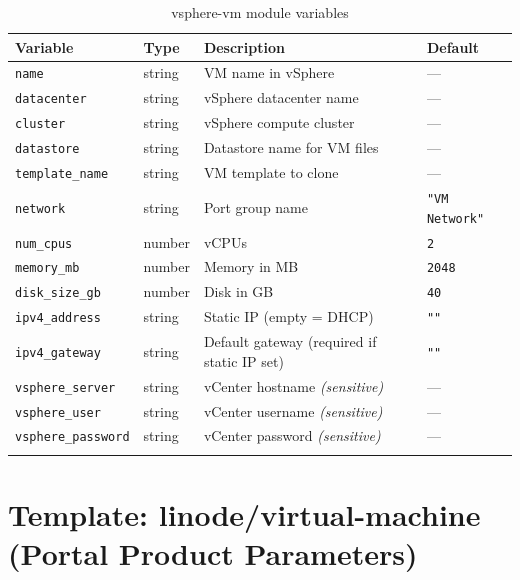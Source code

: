 \documentclass[12pt,a4paper,twoside]{report}
\newcommand{\code}[1]{\texttt{#1}}
\begin{document}
\begin{longtable}{@{}L{4.2cm}lL{5.3cm}l@{}}
  \toprule
  \textbf{Variable} & \textbf{Type} & \textbf{Description} & \textbf{Default} \\
  \midrule
  \endhead
  \code{name}              & string & VM name in vSphere                           & — \\
  \code{datacenter}        & string & vSphere datacenter name                      & — \\
  \code{cluster}           & string & vSphere compute cluster                      & — \\
  \code{datastore}         & string & Datastore name for VM files                  & — \\
  \code{template\_name}    & string & VM template to clone                         & — \\
  \code{network}           & string & Port group name                              & \code{"VM Network"} \\
  \code{num\_cpus}         & number & vCPUs                                        & \code{2} \\
  \code{memory\_mb}        & number & Memory in MB                                 & \code{2048} \\
  \code{disk\_size\_gb}    & number & Disk in GB                                   & \code{40} \\
  \code{ipv4\_address}     & string & Static IP (empty = DHCP)                     & \code{""} \\
  \code{ipv4\_gateway}     & string & Default gateway (required if static IP set)  & \code{""} \\
  \code{vsphere\_server}   & string & vCenter hostname \textit{(sensitive)}        & — \\
  \code{vsphere\_user}     & string & vCenter username \textit{(sensitive)}        & — \\
  \code{vsphere\_password} & string & vCenter password \textit{(sensitive)}        & — \\
  \bottomrule
  \caption{vsphere-vm module variables}
\end{longtable}

\section{Template: linode/virtual-machine (Portal Product Parameters)}
\end{document}
